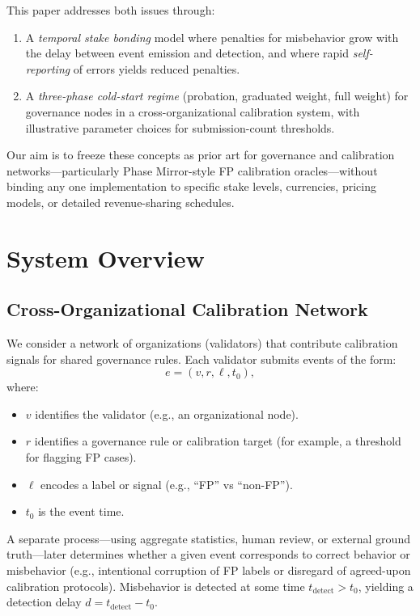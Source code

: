 \documentclass[11pt]{article}
\begin{document}
This paper addresses both issues through:
\begin{enumerate}[leftmargin=*]
  \item A \emph{temporal stake bonding} model where penalties for misbehavior grow with the delay between event emission and detection, and where rapid \emph{self-reporting} of errors yields reduced penalties.
  \item A \emph{three-phase cold-start regime} (probation, graduated weight, full weight) for governance nodes in a cross-organizational calibration system, with illustrative parameter choices for submission-count thresholds.
\end{enumerate}

Our aim is to freeze these concepts as prior art for governance and calibration networks---particularly Phase Mirror-style FP calibration oracles---without binding any one implementation to specific stake levels, currencies, pricing models, or detailed revenue-sharing schedules.

\section{System Overview}

\subsection{Cross-Organizational Calibration Network}

We consider a network of organizations (validators) that contribute calibration signals for shared governance rules.
Each validator submits events of the form:
\[
e = (v, r, \ell, t_0),
\]
where:
\begin{itemize}[leftmargin=*]
  \item \(v\) identifies the validator (e.g., an organizational node).
  \item \(r\) identifies a governance rule or calibration target (for example, a threshold for flagging FP cases).
  \item \(\ell\) encodes a label or signal (e.g., ``FP'' vs ``non-FP'').
  \item \(t_0\) is the event time.
\end{itemize}

A separate process---using aggregate statistics, human review, or external ground truth---later determines whether a given event corresponds to correct behavior or misbehavior (e.g., intentional corruption of FP labels or disregard of agreed-upon calibration protocols).
Misbehavior is detected at some time \(t_{\mathrm{detect}}>t_0\), yielding a detection delay \(d = t_{\mathrm{detect}} - t_0\).
\end{document}
